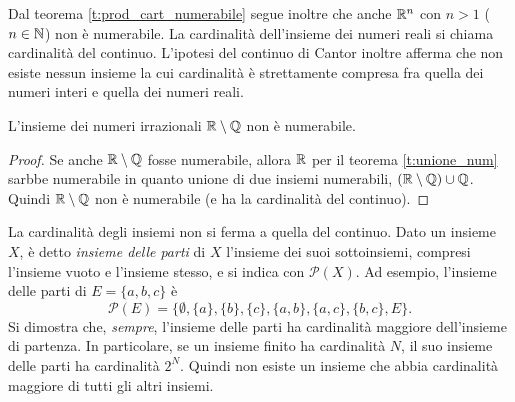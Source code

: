Dal teorema \ref{t:prod_cart_numerabile} segue inoltre che anche $\mathbb{R}^n$ con $n>1$ ($n\in\mathbb{N}$) non è numerabile.
La cardinalità dell'insieme dei numeri reali si chiama cardinalità del continuo. L'ipotesi del continuo di Cantor inoltre afferma che non esiste nessun insieme la cui cardinalità è strettamente compresa fra quella dei numeri interi e quella dei numeri reali.
\begin{corollario}
L'insieme dei numeri irrazionali $\mathbb{R}\setminus\mathbb{Q}$ non è numerabile.
\end{corollario}
\begin{proof}
Se anche $\mathbb{R}\setminus\mathbb{Q}$ fosse numerabile, allora $\mathbb{R}$ per il teorema \ref{t:unione_num} sarbbe numerabile in quanto unione di due insiemi numerabili, $(\mathbb{R}\setminus\mathbb{Q})\cup\mathbb{Q}$. Quindi $\mathbb{R}\setminus\mathbb{Q}$ non è numerabile (e ha la cardinalità del continuo).
\end{proof}
La cardinalità degli insiemi non si ferma a quella del continuo. Dato un insieme $X$, è detto \emph{insieme delle parti} di $X$ l'insieme dei suoi sottoinsiemi, compresi l'insieme vuoto e l'insieme stesso, e si indica con $\mathcal P(X)$. Ad esempio, l'insieme delle parti di $E=\{a,b,c\}$ è
\[
\mathcal P(E)=\Big\{\emptyset,\{a\},\{b\},\{c\},\{a,b\},\{a,c\},\{b,c\},E\Big\}.
\]
Si dimostra che, \textit{sempre}, l'insieme delle parti ha cardinalità maggiore dell'insieme di partenza. In particolare, se un insieme finito ha cardinalità $N$, il suo insieme delle parti ha cardinalità $2^N$.
Quindi non esiste un insieme che abbia cardinalità maggiore di tutti gli altri insiemi.